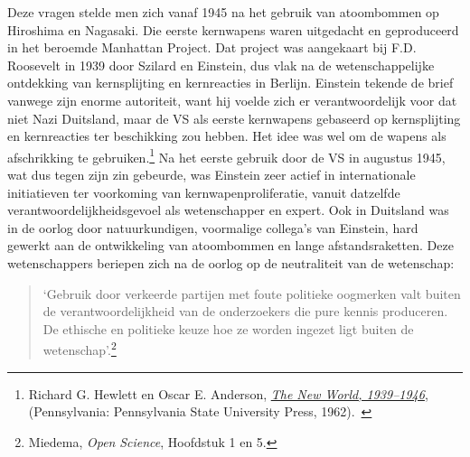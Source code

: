\documentclass[smallauthor, chapterhaspagenum, nochapterinheader, pagenuminheader,  bigchapnum,medium2, tocpages,  garamond, titleinheader]{jote-book}
\begin{document}
	Deze vragen stelde men zich vanaf 1945 na het gebruik van atoombommen op Hiroshima en Nagasaki. Die eerste kernwapens waren uitgedacht en geproduceerd in het beroemde Manhattan Project. Dat project was aangekaart bij F.D. Roosevelt in 1939 door Szilard en Einstein, dus vlak na de wetenschappelijke ontdekking van kernsplijting en kernreacties in Berlijn. Einstein tekende de brief vanwege zijn enorme autoriteit, want hij voelde zich er verantwoordelijk voor dat niet Nazi Duitsland, maar de VS als eerste kernwapens gebaseerd op kernsplijting en kernreacties ter beschikking zou hebben. Het idee was wel om de wapens als afschrikking te gebruiken.\footnote{Richard G. Hewlett en Oscar E. Anderson, \href{about:blank}{\emph{The New World, 1939--1946}},\emph{ }(Pennsylvania: Pennsylvania State University Press, 1962). } Na het eerste gebruik door de VS in augustus 1945, wat dus tegen zijn zin gebeurde, was Einstein zeer actief in internationale initiatieven ter voorkoming van kernwapenproliferatie, vanuit datzelfde verantwoordelijkheidsgevoel als wetenschapper en expert. Ook in Duitsland was in de oorlog door natuurkundigen, voormalige collega's van Einstein, hard gewerkt aan de ontwikkeling van atoombommen en lange afstandsraketten. Deze wetenschappers beriepen zich na de oorlog op de neutraliteit van de wetenschap:

	\begin{quote}
		\itshape

		‘Gebruik door verkeerde partijen met foute politieke oogmerken valt buiten de verantwoordelijkheid van de onderzoekers die pure kennis produceren. De ethische en politieke keuze hoe ze worden ingezet ligt buiten de wetenschap'.\footnote{Miedema, \emph{Open }\emph{Science}, Hoofdstuk 1 en 5.}
	\end{quote}
\end{document}
